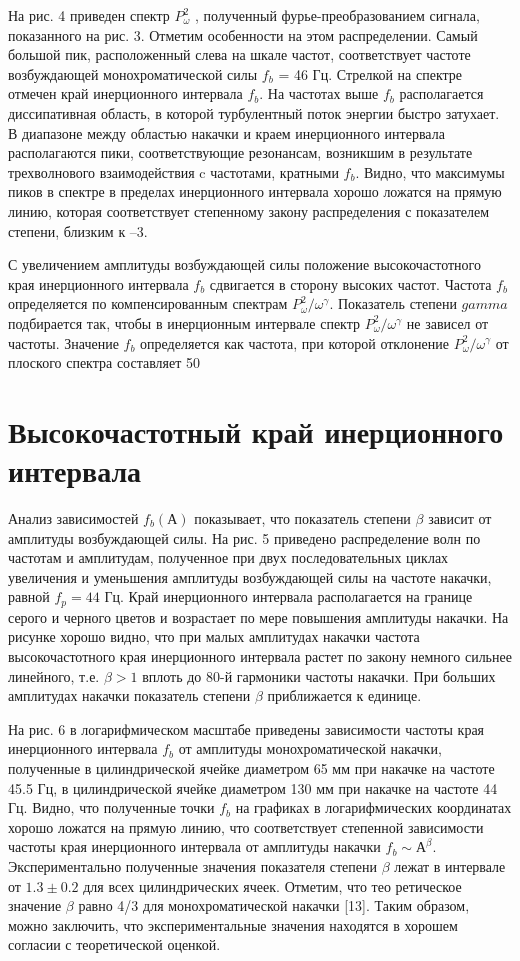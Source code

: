 На рис. 4 приведен спектр $P^2_\omega$ , полученный фурье-преобразованием сигнала, показанного на рис. 3. Отметим особенности на этом распределении. Самый большой пик, расположенный слева на шкале частот, соответствует частоте возбуждающей монохроматической силы $f_b$ = 46 Гц. Стрелкой на спектре отмечен край инерционного интервала $f_b$. На частотах выше $f_b$ располагается диссипативная область, в которой турбулентный поток энергии быстро затухает. В диапазоне между областью накачки и краем инерционного интервала располагаются пики, соответствующие резонансам, возникшим в результате трехволнового взаимодействия c частотами, кратными $f_b$. Видно, что максимумы пиков в спектре в пределах инерционного интервала хорошо ложатся на прямую линию, которая соответствует степенному закону распределения с показателем степени, близким к –3.

С увеличением амплитуды возбуждающей силы положение высокочастотного края инерционного интервала $f_b$ сдвигается в сторону высоких частот. Частота $f_b$ определяется по компенсированным спектрам $P_\omega^2/\omega^\gamma$. Показатель степени $gamma$ подбирается так, чтобы в инерционным интервале спектр $P_\omega^2/\omega^\gamma$ не зависел от частоты. Значение $f_b$ определяется как частота, при которой отклонение $P_\omega^2/\omega^\gamma$ от плоского спектра составляет 50%
\section{Высокочастотный край инерционного интервала} \label{sect2_3}

Анализ зависимостей $f_b(А)$ показывает, что показатель степени $\beta$ зависит от амплитуды возбуждающей силы. На рис. 5 приведено распределение волн по частотам и амплитудам, полученное при двух последовательных циклах увеличения и уменьшения амплитуды возбуждающей силы на частоте накачки, равной $f_p = 44$ Гц. Край инерционного интервала располагается на границе серого и черного цветов и возрастает по мере повышения амплитуды накачки. На рисунке хорошо видно, что при малых амплитудах накачки частота высокочастотного края инерционного интервала растет по закону немного сильнее линейного, т.е. $\beta > 1$ вплоть до 80-й гармоники частоты накачки. При больших амплитудах накачки показатель степени $\beta$ приближается к единице.

На рис. 6 в логарифмическом масштабе приведены зависимости частоты края инерционного интервала $f_b$ от амплитуды монохроматической накачки, полученные в цилиндрической ячейке диаметром 65 мм при накачке на частоте 45.5 Гц, в цилиндрической ячейке диаметром 130 мм при накачке на частоте 44 Гц. Видно, что полученные точки $f_b$ на графиках в логарифмических координатах хорошо ложатся на прямую линию, что соответствует степенной зависимости частоты края инерционного интервала от амплитуды накачки $f_b \sim А^\beta$. Экспериментально полученные значения показателя степени $\beta$ лежат в интервале от $1.3 \pm 0.2$ для всех цилиндрических ячеек. Отметим, что тео ретическое значение $\beta$ равно 4/3 для монохроматической накачки [13]. Таким образом, можно заключить, что экспериментальные значения находятся в хорошем согласии с теоретической оценкой.

